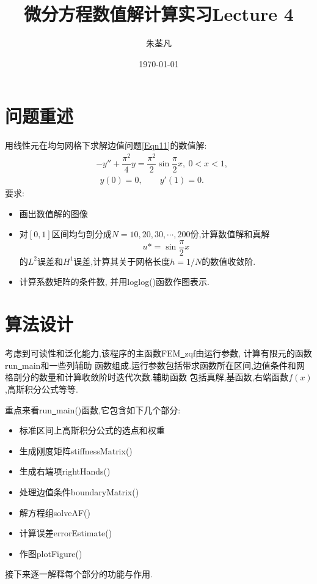 \documentclass[11pt,reqno]{article}
\numberwithin{equation}{section}
\begin{document}
\title{微分方程数值解计算实习Lecture 4}

\author{朱荃凡}
\date{\today}

\maketitle

\vspace{50pt}

\section{问题重述}
用线性元在均匀网格下求解边值问题\eqref{Eqn11}的数值解:
\begin{equation}\label{Eqn11}
	\begin{split}
	&-y''+\dfrac{\pi^2}{4}y=\dfrac{\pi^2}{2}\sin\dfrac{\pi}{2}x,\ 0<x<1,\\
	&\ \ y(0)=0,\qquad y'(1)=0.
	\end{split}
\end{equation}
要求:
\begin{itemize}
	\item  画出数值解的图像
	\item 对$[0,1]$区间均匀剖分成$N=10,20,30,\cdots,200$份,计算数值解和真解
	 \[u*=\sin\dfrac{\pi}{2}x\]
	的$L^2$误差和$H^1$误差,计算其关于网格长度$h=1/N$的数值收敛阶.
	\item 计算系数矩阵的条件数, 并用loglog()函数作图表示.
\end{itemize}

\newpage

\section{算法设计}
考虑到可读性和泛化能力,该程序的主函数FEM\underline{\ }zqf由运行参数, 
计算有限元的函数run\underline{\ }main和一些列辅助
函数组成.运行参数包括带求函数所在区间,边值条件和网格剖分的数量和计算收敛阶时迭代次数.辅助函数
包括真解,基函数,右端函数$f(x)$,高斯积分公式等等.

重点来看run\underline{\ }main()函数,它包含如下几个部分:

\begin{itemize}
	\item 标准区间上高斯积分公式的选点和权重
	\item 生成刚度矩阵stiffnessMatrix()
	\item 生成右端项rightHands()
	\item 处理边值条件boundaryMatrix()
	\item 解方程组solveAF()
	\item 计算误差errorEstimate()
	\item 作图plotFigure()
\end{itemize}
接下来逐一解释每个部分的功能与作用.
\end{document}
